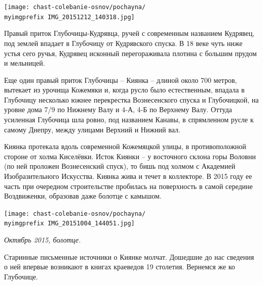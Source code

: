 \begin{center}
\texttt{[image: chast-colebanie-osnov/pochayna/\\myimgprefix IMG\_20151212\_140318.jpg]}
\end{center}

\newpage

Правый приток Глубочицы-Кудрявца, ручей с современным названием Кудрявец, под землей впадает в Глубочицу от Кудрявского спуска. В 18 веке чуть ниже устья сего ручья, Кудрявец исконный перегораживала плотина с большим прудом и мельницей.


Еще один правый приток Глубочицы – Киянка – длиной около 700 метров, вытекает из урочища Кожемяки и, когда русло было естественным, впадала в Глубочицу несколько южнее перекрестка Вознесенского спуска и Глубочицкой, на уровне дома 7/9 по Нижнему Валу и 4-А, 4-Б по Верхнему Валу. Оттуда усиленная Глубочица шла ровно, под названием Канавы, в спрямленном русле к самому Днепру, между улицами Верхний и Нижний вал.

Киянка протекала вдоль современной Кожемяцкой улицы, в противоположной стороне от холма Киселёвки. Исток Киянки – у восточного склона горы Воловни (по ней проложен Вознесенский спуск), то бишь под холмом с Академией Изобразительного Искусства. Киянка жива и течет в коллекторе. В 2015 году ее часть при очередном строительстве пробилась на поверхность в самой середине Воздвиженки, образовав даже болотце с камышом.

\begin{center}
\texttt{[image: chast-colebanie-osnov/pochayna/\\myimgprefix IMG\_20151004\_144051.jpg]}

\textit{Октябрь 2015, болотце.}
\end{center}

Старинные письменные источники о Киянке молчат. Дошедшие до нас сведения о ней впервые возникают в книгах краеведов 19 столетия. Вернемся же ко Глубочице.

